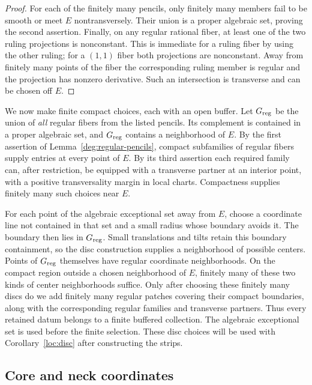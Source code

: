 \begin{proof}
For each of the finitely many pencils, only finitely many members
fail to be smooth or meet $E$ nontransversely.  Their union is a
proper algebraic set, proving the second assertion.  Finally, on
any regular rational fiber, at least one of the two ruling
projections is nonconstant.  This is immediate for a ruling fiber
by using the other ruling; for a $(1,1)$ fiber both projections are
nonconstant.  Away from finitely many points of the fiber the
corresponding ruling member is regular and the projection has
nonzero derivative.  Such an intersection is transverse and can
be chosen off $E$.
\end{proof}

We now make finite compact choices, each with an open buffer.
Let $G_{\rm reg}$ be the union of \emph{all} regular fibers from
the listed pencils.  Its complement is contained in a proper
algebraic set, and $G_{\rm reg}$ contains a neighborhood of $E$.
By the first assertion of Lemma~\ref{deg:regular-pencils}, compact
subfamilies of regular fibers supply entries at every point of
$E$.  By its third assertion each required family can, after
restriction, be equipped with a transverse partner at an
interior point, with a positive transversality margin in local
charts.  Compactness supplies finitely many such choices near
$E$.

For each point of the algebraic exceptional set away from $E$,
choose a coordinate line not contained in that set and a small
radius whose boundary avoids it.  The boundary then lies in
$G_{\rm reg}$.  Small translations and tilts retain this boundary
containment, so the disc construction supplies a neighborhood of
possible centers.  Points of $G_{\rm reg}$ themselves have regular
coordinate neighborhoods.  On the compact region outside a
chosen neighborhood of $E$, finitely many of these two kinds of
center neighborhoods suffice.  Only after choosing these finitely
many discs do we add finitely many regular patches covering their
compact boundaries, along with the corresponding regular
families and transverse partners.  Thus every retained datum
belongs to a finite buffered collection.  The algebraic
exceptional set is used before the finite selection.  These
disc choices will be used with
Corollary~\ref{loc:disc} after constructing the strips.

\subsection{Core and neck coordinates}

